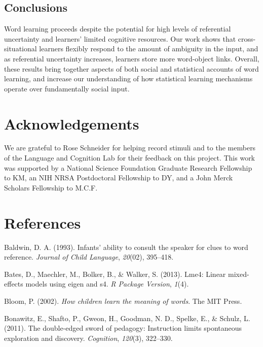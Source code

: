 \documentclass[authoryear, review]{elsarticle}
\begin{document}
\subsection{Conclusions}\label{conclusions}

Word learning proceeds despite the potential for high levels of
referential uncertainty and learners' limited cognitive resources. Our
work shows that cross-situational learners flexibly respond to the
amount of ambiguity in the input, and as referential uncertainty
increases, learners store more word-object links. Overall, these results
bring together aspects of both social and statistical accounts of word
learning, and increase our understanding of how statistical learning
mechanisms operate over fundamentally social input.

\newpage

\section{Acknowledgements}\label{acknowledgements}

We are grateful to Rose Schneider for helping record stimuli and to the
members of the Language and Cognition Lab for their feedback on this
project. This work was supported by a National Science Foundation
Graduate Research Fellowship to KM, an NIH NRSA Postdoctoral Fellowship
to DY, and a John Merck Scholars Fellowship to M.C.F.

\newpage

\section{References}\label{references}

\setlength{\parindent}{-0.1in} \setlength{\leftskip}{0.125in} \noindent

\hypertarget{refs}{}
\hypertarget{ref-baldwin1993infants}{}
Baldwin, D. A. (1993). Infants' ability to consult the speaker for clues
to word reference. \emph{Journal of Child Language}, \emph{20}(02),
395--418.

\hypertarget{ref-bates2013lme4}{}
Bates, D., Maechler, M., Bolker, B., \& Walker, S. (2013). Lme4: Linear
mixed-effects models using eigen and s4. \emph{R Package Version},
\emph{1}(4).

\hypertarget{ref-bloom2002children}{}
Bloom, P. (2002). \emph{How children learn the meaning of words}. The
MIT Press.

\hypertarget{ref-bonawitz2011double}{}
Bonawitz, E., Shafto, P., Gweon, H., Goodman, N. D., Spelke, E., \&
Schulz, L. (2011). The double-edged sword of pedagogy: Instruction
limits spontaneous exploration and discovery. \emph{Cognition},
\emph{120}(3), 322--330.
\end{document}
